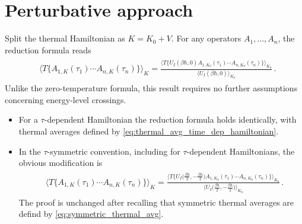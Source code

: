 \documentclass[../QFT_main.tex]{subfiles}
\begin{document}
\section{Perturbative approach}

\begin{mytheorem}
%
Split the thermal Hamiltonian as $K=K_0+V$.
For any operators $A_1,\ldots,A_n$, the reduction formula reads
{\small\begin{align}\begin{aligned}
    &\Big\langle
        T\big\{
            A_{1,K}(\tau_1)\cdots A_{n,K}(\tau_n)
        \big\}
    \Big\rangle_K
=
    \tfrac{
        \Big\langle
            T\big\{
                U_I(\beta\hbar,0)
                A_{1,K_0}(\tau_1)\cdots A_{n,K_0}(\tau_n)
            \big\}
        \Big\rangle_{K_0}
    }{
        \big\langle U_I(\beta\hbar,0)\big\rangle_{K_0}
    }\,.
\end{aligned}\end{align}}
Unlike the zero-temperature formula, this result requires no further assumptions concerning energy-level crossings.
\begin{itemize}
    \item For a $\tau$-dependent Hamiltonian the reduction formula holds identically, with thermal averages defined by \eqref{eq:thermal_avg_time_dep_hamiltonian}.
\item In the $\tau$-symmetric convention, including for $\tau$-dependent Hamiltonians, the obvious modification is
{\small\begin{align}\begin{aligned}
    &\Big\langle
        T\big\{
            A_{1,K}(\tau_1)\cdots A_{n,K}(\tau_n)
        \big\}
    \Big\rangle_K
=
    \tfrac{
        \Big\langle
            T\big\{
                U_I\big(\tfrac{\beta\hbar}{2},-\tfrac{\beta\hbar}{2}\big)
                A_{1,K_0}(\tau_1)\cdots A_{n,K_0}(\tau_n)
            \big\}
        \Big\rangle_{K_0}
    }{
        \Big\langle
            U_I\big(\tfrac{\beta\hbar}{2},-\tfrac{\beta\hbar}{2}\big)
        \Big\rangle_{K_0}
    }\,.
\end{aligned}\end{align}}
The proof is unchanged after recalling that symmetric thermal averages are defind by \eqref{eq:symmetric_thermal_avg}.
\end{itemize}
\end{mytheorem}
\end{document}
